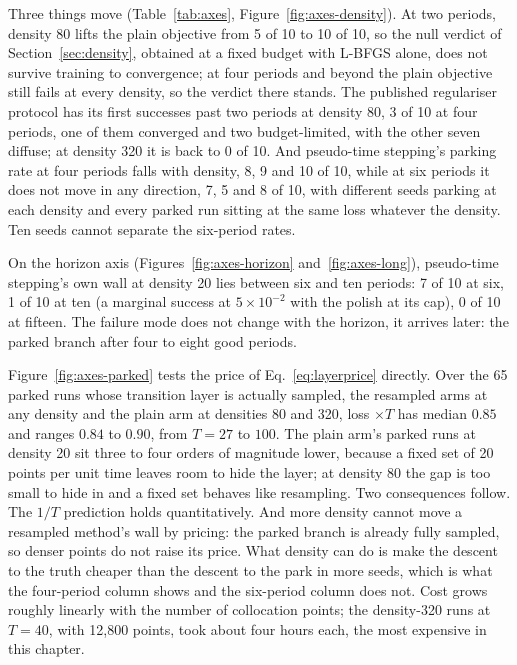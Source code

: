 \documentclass[11pt,a4paper]{article}
\begin{document}
Three things move (Table~\ref{tab:axes}, Figure~\ref{fig:axes-density}).
At two periods, density 80 lifts the plain objective from 5 of 10 to
10 of 10, so the null verdict of Section~\ref{sec:density}, obtained at
a fixed budget with L-BFGS alone, does not survive training to
convergence; at four periods and beyond the plain objective still fails
at every density, so the verdict there stands. The published
regulariser protocol has its first successes past two periods at
density 80, 3 of 10 at four periods, one of them converged and two
budget-limited, with the other seven diffuse; at density 320 it is back
to 0 of 10. And pseudo-time stepping's parking rate at four periods
falls with density, 8, 9 and 10 of 10, while at six periods it does not
move in any direction, 7, 5 and 8 of 10, with different seeds parking
at each density and every parked run sitting at the same loss whatever
the density. Ten seeds cannot separate the six-period rates.

On the horizon axis (Figures~\ref{fig:axes-horizon}
and~\ref{fig:axes-long}), pseudo-time stepping's own wall at density 20
lies between six and ten periods: 7 of 10 at six, 1 of 10 at ten (a
marginal success at $5\times10^{-2}$ with the polish at its cap), 0 of
10 at fifteen. The failure mode does not change with the horizon, it
arrives later: the parked branch after four to eight good periods.

Figure~\ref{fig:axes-parked} tests the price of Eq.~\eqref{eq:layerprice}
directly. Over the 65 parked runs whose transition layer is actually
sampled, the resampled arms at any density and the plain arm at
densities 80 and 320, loss $\times T$ has median $0.85$ and ranges
$0.84$ to $0.90$, from $T = 27$ to $100$. The plain arm's parked runs at
density 20 sit three to four orders of magnitude lower, because a fixed
set of 20 points per unit time leaves room to hide the layer; at
density 80 the gap is too small to hide in and a fixed set behaves like
resampling. Two consequences follow. The $1/T$ prediction holds
quantitatively. And more density cannot move a resampled method's wall
by pricing: the parked branch is already fully sampled, so denser points
do not raise its price. What density can do is make the descent to the
truth cheaper than the descent to the park in more seeds, which is what
the four-period column shows and the six-period column does not. Cost
grows roughly linearly with the number of collocation points; the
density-320 runs at $T = 40$, with 12,800 points, took about four hours
each, the most expensive in this chapter.
\end{document}
